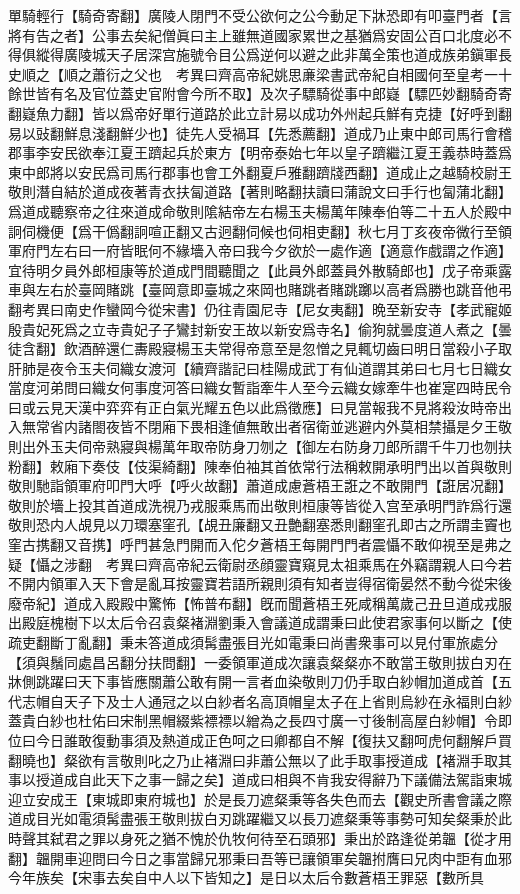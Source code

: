 單騎輕行【騎奇寄翻】廣陵人閉門不受公欲何之公今動足下牀恐即有叩臺門者【言將有告之者】公事去矣紀僧眞曰主上雖無道國家累世之基猶爲安固公百口北度必不得俱縱得廣陵城天子居深宫施號令目公爲逆何以避之此非萬全策也道成族弟鎭軍長史順之【順之蕭衍之父也　考異曰齊高帝紀姚思亷梁書武帝紀自相國何至皇考一十餘世皆有名及官位蓋史官附會今所不取】及次子驃騎從事中郎嶷【驃匹妙翻騎奇寄翻嶷魚力翻】皆以爲帝好單行道路於此立計易以成功外州起兵鮮有克捷【好呼到翻易以䜴翻鮮息淺翻鮮少也】徒先人受禍耳【先悉薦翻】道成乃止東中郎司馬行會稽郡事李安民欲奉江夏王躋起兵於東方【明帝泰始七年以皇子躋繼江夏王義恭時蓋爲東中郎將以安民爲司馬行郡事也會工外翻夏戶雅翻躋牋西翻】道成止之越騎校尉王敬則潛自結於道成夜著青衣扶匐道路【著則略翻扶讀曰蒲說文曰手行也匐蒲北翻】爲道成聽察帝之往來道成命敬則隂結帝左右楊玉夫楊萬年陳奉伯等二十五人於殿中詗伺機便【爲干僞翻詗喧正翻又古迥翻伺候也伺相吏翻】秋七月丁亥夜帝微行至領軍府門左右曰一府皆眠何不緣墻入帝曰我今夕欲於一處作適【適意作戲謂之作適】宜待明夕員外郎桓康等於道成門間聽聞之【此員外郎蓋員外散騎郎也】戊子帝乘露車與左右於臺岡賭跳【臺岡意即臺城之來岡也賭跳者賭跳躑以高者爲勝也跳音他弔翻考異曰南史作蠻岡今從宋書】仍往青園尼寺【尼女夷翻】晩至新安寺【孝武寵姬殷貴妃死爲之立寺貴妃子子鸞封新安王故以新安爲寺名】偷狗就曇度道人煮之【曇徒含翻】飲酒醉還仁夀殿寢楊玉夫常得帝意至是忽憎之見輒切齒曰明日當殺小子取肝肺是夜令玉夫伺織女渡河【續齊諧記曰桂陽成武丁有仙道謂其弟曰七月七日織女當度河弟問曰織女何事度河答曰織女暫詣牽牛人至今云織女嫁牽牛也崔寔四時民令曰或云見天漢中弈弈有正白氣光耀五色以此爲徵應】曰見當報我不見將殺汝時帝出入無常省内諸閤夜皆不閉廂下畏相逢値無敢出者宿衛並逃避内外莫相禁攝是夕王敬則出外玉夫伺帝熟寢與楊萬年取帝防身刀刎之【御左右防身刀郎所謂千牛刀也刎扶粉翻】敕廂下奏伎【伎渠綺翻】陳奉伯袖其首依常行法稱敕開承明門出以首與敬則敬則馳詣領軍府叩門大呼【呼火故翻】蕭道成慮蒼梧王誑之不敢開門【誑居况翻】敬則於墻上投其首道成洗視乃戎服乘馬而出敬則桓康等皆從入宫至承明門詐爲行還敬則恐内人覘見以刀環塞窐孔【覘丑廉翻又丑艶翻塞悉則翻窐孔即古之所謂圭竇也窐古携翻又音携】呼門甚急門開而入佗夕蒼梧王每開門門者震懾不敢仰視至是弗之疑【懾之涉翻　考異曰齊高帝紀云衛尉丞顔靈寶窺見太祖乘馬在外竊謂親人曰今若不開内領軍入天下會是亂耳按靈寶若語所親則須有知者豈得宿衛晏然不動今從宋後廢帝紀】道成入殿殿中驚怖【怖普布翻】旣而聞蒼梧王死咸稱萬歲己丑旦道成戎服出殿庭槐樹下以太后令召袁粲褚淵劉秉入會議道成謂秉曰此使君家事何以斷之【使疏吏翻斷丁亂翻】秉未答道成須髯盡張目光如電秉曰尚書衆事可以見付軍旅處分【須與鬚同處昌呂翻分扶問翻】一委領軍道成次讓袁粲粲亦不敢當王敬則拔白刃在牀側跳躍曰天下事皆應關蕭公敢有開一言者血染敬則刀仍手取白紗帽加道成首【五代志帽自天子下及士人通冠之以白紗者名高頂帽皇太子在上省則烏紗在永福則白紗蓋貴白紗也杜佑曰宋制黑帽綴紫褾褾以繒為之長四寸廣一寸後制高屋白紗帽】令即位曰今日誰敢復動事須及熱道成正色呵之曰卿都自不解【復扶又翻呵虎何翻解戶買翻曉也】粲欲有言敬則叱之乃止褚淵曰非蕭公無以了此手取事授道成【褚淵手取其事以授道成自此天下之事一歸之矣】道成曰相與不肯我安得辭乃下議備法駕詣東城迎立安成王【東城即東府城也】於是長刀遮粲秉等各失色而去【觀史所書會議之際道成目光如電須髯盡張王敬則拔白刃跳躍繼又以長刀遮粲秉等事勢可知矣粲秉於此時聲其弑君之罪以身死之猶不愧於仇牧何待至石頭邪】秉出於路逢從弟韞【從才用翻】韞開車迎問曰今日之事當歸兄邪秉曰吾等已讓領軍矣韞拊膺曰兄肉中詎有血邪今年族矣【宋事去矣自中人以下皆知之】是日以太后令數蒼梧王罪惡【數所具